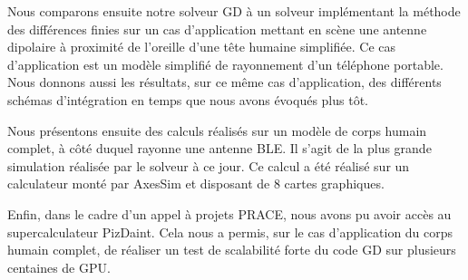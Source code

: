 Nous comparons ensuite notre solveur GD à un solveur implémentant
la méthode des différences finies sur un cas d'application
mettant en scène une antenne dipolaire à proximité de l'oreille d'une tête
humaine simplifiée.
Ce cas d'application est un modèle simplifié de rayonnement d'un téléphone portable.
Nous donnons aussi les résultats, sur ce même cas d'application,
des différents schémas d'intégration en temps que nous avons évoqués plus tôt.


Nous présentons ensuite des calculs réalisés sur un modèle de corps humain complet, à côté duquel
rayonne une antenne BLE.
Il s'agit de la plus grande simulation réalisée par le solveur à ce jour.
Ce calcul a été réalisé sur un calculateur monté par AxesSim et disposant de 8 cartes graphiques.

Enfin, dans le cadre d'un appel à projets PRACE, nous avons pu avoir accès au
supercalculateur PizDaint. Cela nous a permis, sur le cas d'application du corps humain complet, de réaliser un
test de scalabilité forte du code GD sur plusieurs centaines de GPU.
